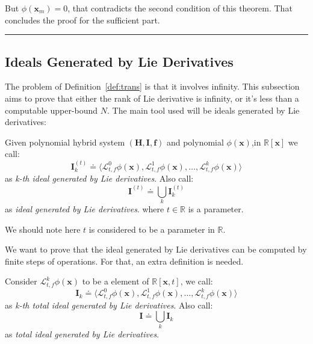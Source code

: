 \documentclass{jssc}
\newcommand{\rulex}{\hfill\rule{1mm}{3mm}}
\begin{document}
But $\phi(\boldsymbol{x}_m) = 0$, that contradicts the second condition of this theorem. That concludes the proof for the sufficient part.
\rulex \newline

\subsection{Ideals Generated by Lie Derivatives}
\label{sub:original}
The problem of Definition~\ref{def:trans} is that it involves infinity. This subsection aims to prove that either the rank of Lie derivative is infinity, or it's less than a computable upper-bound $N$. The main tool used will be ideals generated by Lie derivatives:

\begin{definition}
\label{def:lieIdeal}
Given polynomial hybrid system $(\boldsymbol{H}, \boldsymbol{I}, \boldsymbol{f})$ and polynomial $\phi(\boldsymbol{x})$,in $\mathbb{R}[\boldsymbol{x}]$ we call:
		\begin{equation*}
			\boldsymbol{I}_k^{(t)} \doteq \langle \mathcal{L}_{t, f}^0 \phi(\boldsymbol{x}), \mathcal{L}_{t, f}^1 \phi(\boldsymbol{x}), \dots, \mathcal{L}_{t, f}^k \phi(\boldsymbol{x}) \rangle
		\end{equation*}
		as \emph{k-th ideal generated by Lie derivatives}. Also call:
		\begin{equation*}
			\boldsymbol{I}^{(t)} \doteq \bigcup_k \boldsymbol{I}_k^{(t)}
		\end{equation*}
		as \emph{ideal generated by Lie derivatives}. where $t \in \mathbb{R}$ is a parameter.
\end{definition}
We should note here $t$ is considered to be a parameter in $\mathbb{R}$.

We want to prove that the ideal generated by Lie derivatives can be computed by finite steps of operations. For that, an extra definition is needed.

\begin{definition}
\label{def:lieTot}
Consider $\mathcal{L}_{t, f}^k \phi(\boldsymbol{x})$ to be a element of $\mathbb{R}[\boldsymbol{x}, t]$, we call:
	\begin{equation*}
		\boldsymbol{I}_k \doteq \langle \mathcal{L}_{t, f}^0 \phi(\boldsymbol{x}), \mathcal{L}_{t, f}^1 \phi(\boldsymbol{x}), \dots, \mathcal{L}_{t, f}^k \phi(\boldsymbol{x}) \rangle
	\end{equation*}	
	as \emph{k-th total ideal generated by Lie derivatives}. Also call:
	\begin{equation*}
		\boldsymbol{I} \doteq \bigcup_k \boldsymbol{I}_k
	\end{equation*}
	as \emph{total ideal generated by Lie derivatives}.
\end{definition}
\end{document}
